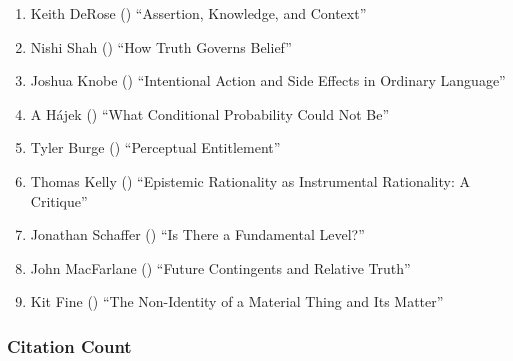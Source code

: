 \documentclass[
  10pt,
  letterpaper,
  DIV=11,
  numbers=noendperiod,
  twoside]{scrartcl}
\providecommand{\tightlist}{%
  \setlength{\itemsep}{0pt}\setlength{\parskip}{0pt}}\usepackage{longtable,booktabs,array}
\begin{document}
\begin{enumerate}
\def\labelenumi{\arabic{enumi}.}
\tightlist
\item
  Keith DeRose () ``Assertion,
  Knowledge, and Context''
\item
  Nishi Shah () ``How Truth
  Governs Belief''
\item
  Joshua Knobe () ``Intentional
  Action and Side Effects in Ordinary Language''
\item
  A Hájek () ``What Conditional
  Probability Could Not Be''
\item
  Tyler Burge () ``Perceptual
  Entitlement''
\item
  Thomas Kelly () ``Epistemic
  Rationality as Instrumental Rationality: A Critique''
\item
  Jonathan Schaffer () ``Is There
  a Fundamental Level?''
\item
  John MacFarlane () ``Future
  Contingents and Relative Truth''
\item
  Kit Fine () ``The Non-Identity
  of a Material Thing and Its Matter''
\end{enumerate}

\subsubsection*{Citation Count}\label{sec-count-2003}
\end{document}
